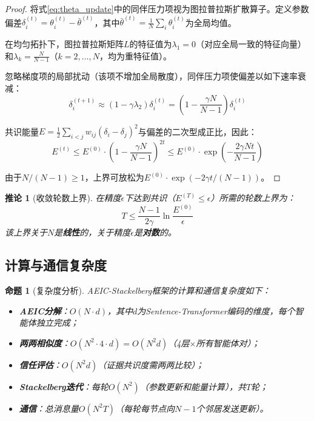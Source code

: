 \documentclass[12pt,a4paper,UTF8,fontset=fandol]{ctexart}
\newtheorem{proposition}{命题}[section]
\newtheorem{corollary}{推论}[section]
\begin{document}
\begin{proof}
将式\eqref{eq:theta_update}中的同伴压力项视为图拉普拉斯扩散算子。定义参数偏差$\delta_i^{(t)} = \theta_i^{(t)} - \bar{\theta}^{(t)}$，其中$\bar{\theta}^{(t)} = \frac{1}{N}\sum_i \theta_i^{(t)}$为全局均值。

在均匀拓扑下，图拉普拉斯矩阵$L$的特征值为$\lambda_1 = 0$（对应全局一致的特征向量）和$\lambda_k = \frac{N}{N-1}$（$k = 2, \ldots, N$，均为重特征值）。

忽略梯度项的局部扰动（该项不增加全局散度），同伴压力项使偏差以如下速率衰减：
\begin{equation}
\delta_i^{(t+1)} \approx (1 - \gamma \lambda_2) \delta_i^{(t)} = \left(1 - \frac{\gamma N}{N-1}\right) \delta_i^{(t)}
\end{equation}

共识能量$E = \frac{1}{2}\sum_{i<j} w_{ij} (\delta_i - \delta_j)^2$与偏差的二次型成正比，因此：
\begin{equation}
E^{(t)} \leq E^{(0)} \cdot \left(1 - \frac{\gamma N}{N-1}\right)^{2t} \leq E^{(0)} \cdot \exp\!\left(-\frac{2\gamma N t}{N-1}\right)
\end{equation}

由于$N/(N-1) \geq 1$，上界可放松为$E^{(0)} \cdot \exp(-2\gamma t/(N-1))$。
\end{proof}

\begin{corollary}[收敛轮数上界]
在精度$\epsilon$下达到共识（$E^{(T)} \leq \epsilon$）所需的轮数上界为：
\begin{equation}
T \leq \frac{N-1}{2\gamma} \ln\frac{E^{(0)}}{\epsilon}
\end{equation}
该上界关于$N$是\textbf{线性}的，关于精度$\epsilon$是\textbf{对数}的。
\end{corollary}

\subsection{计算与通信复杂度}

\begin{proposition}[复杂度分析]\label{prop:complexity}
AEIC-Stackelberg框架的计算和通信复杂度如下：
\begin{itemize}[nosep]
    \item \textbf{AEIC分解}：$O(N \cdot d)$，其中$d$为Sentence-Transformer编码的维度，每个智能体独立完成；
    \item \textbf{两两相似度}：$O(N^2 \cdot 4 \cdot d) = O(N^2 d)$（4层$\times$所有智能体对）；
    \item \textbf{信任评估}：$O(N^2 d)$（证据共识度需两两比较）；
    \item \textbf{Stackelberg迭代}：每轮$O(N^2)$（参数更新和能量计算），共$T$轮；
    \item \textbf{通信}：总消息量$O(N^2 T)$（每轮每节点向$N-1$个邻居发送更新）。
\end{itemize}
\end{proposition}
\end{document}
